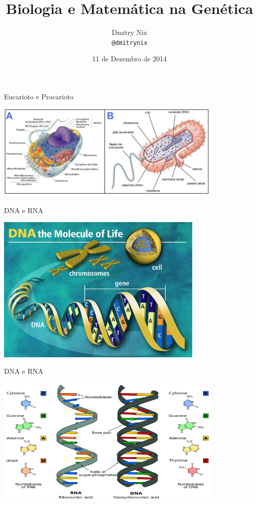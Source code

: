 \documentclass[]{beamer}
\author[Dmitry]{Dmitry Nix \\ \texttt{@dmitrynix}}
\title{Biologia e Matemática na Genética}
\institute{UFPI}
\date{11 de Dezembro de 2014}
\begin{document}
  \begin{frame}
    \titlepage
  \end{frame}


  \begin{frame}{Eucarioto e Procarioto}
    \begin{center}
      \includegraphics[width=11cm]{images/eucarioto-procarioto.png}
    \end{center}
  \end{frame}

  \begin{frame}{DNA e RNA}
    \begin{center}
      \includegraphics[width=10cm]{images/dna-e-rna-1.png}
    \end{center}
  \end{frame}

  \begin{frame}{DNA e RNA}
    \begin{center}
      \includegraphics[width=11cm]{images/dna-e-rna.png}
    \end{center}
  \end{frame}
\end{document}
